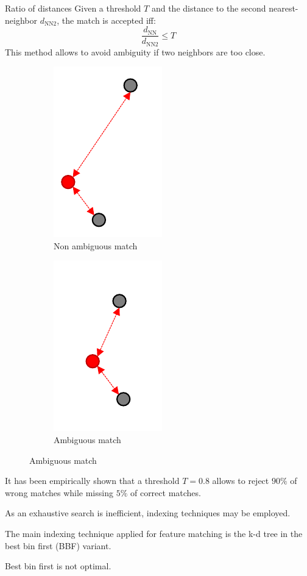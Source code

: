 \begin{description}
\begin{descriptionlist}
            \item[Ratio of distances] 
                Given a threshold $T$ and the distance to the second nearest-neighbor $d_\text{NN2}$, the match is accepted iff:
                \[ \frac{d_\text{NN}}{d_\text{NN2}} \leq T \]
                This method allows to avoid ambiguity if two neighbors are too close.
                \begin{figure}[H]
                    \centering
                    \begin{subfigure}{0.4\linewidth}
                        \centering
                        \includegraphics[width=0.2\linewidth]{./img/_nn_matching_example1.pdf}
                        \caption{Non ambiguous match}
                    \end{subfigure}
                    \begin{subfigure}{0.4\linewidth}
                        \centering
                        \includegraphics[width=0.2\linewidth]{./img/_nn_matching_example2.pdf}
                        \caption{Ambiguous match}
                    \end{subfigure}
                \end{figure}
        \end{descriptionlist}

        \begin{remark}
            It has been empirically shown that a threshold $T=0.8$ allows to reject $90\%$ of wrong matches while missing $5\%$ of correct matches.
        \end{remark}

    \item[Efficient NN search] 
        As an exhaustive search is inefficient, indexing techniques may be employed.

        The main indexing technique applied for feature matching is the k-d tree in the best bin first (BBF) variant.

        \begin{remark}
            Best bin first is not optimal.
        \end{remark}
\end{description}